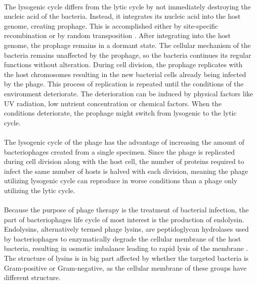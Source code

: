 \paragraph*{}
The lysogenic cycle differs from the lytic cycle by not immediately destroying the nucleic acid of the bacteria. Instead, it integrates its nucleic acid into the host genome, creating prophage. This is accomplished either by site-specific recombination or by random transposition \cite{guttman2005basic}. After integrating into the host genome, the prophage remains in a dormant state. The cellular mechanism of the bacteria remains unaffected by the prophage, so the bacteria continues its regular functions without alteration. During cell division, the prophage replicates with the host chromosomes resulting in the new bacterial cells already being infected by the phage. This process of replication is repeated until the conditions of the environment deteriorate. The deterioration can be induced by physical factors like UV radiation, low nutrient concentration or chemical factors. When the conditions deteriorate, the prophage might switch from lysogenic to the lytic cycle. 
\paragraph*{}
The lysogenic cycle of the phage has the advantage of increasing the amount of bacteriophages created from a single specimen. Since the phage is replicated during cell division along with the host cell, the number of proteins required to infect the same number of hosts is halved with each division, meaning the phage utilizing lysogenic cycle can reproduce in worse conditions than a phage only utilizing the lytic cycle.
\paragraph*{}
Because the purpose of phage therapy is the treatment of bacterial infection, the part of bacteriophages life cycle of most interest is the production of endolysin. Endolysins, alternatively termed phage lysins, are peptidoglycan hydrolases used by bacteriophages to enzymatically degrade the cellular membrane of the host bacteria, resulting in osmotic imbalance leading to rapid lysis of the membrane \cite{schmelcher2012bacteriophage}. The structure of lysins is in big part affected by whether the targeted bacteria is Gram-positive or Gram-negative, as the cellular membrane of these groups have different structure. 

